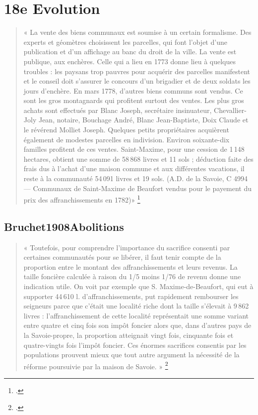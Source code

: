 \documentclass[12pt,a4paper]{report}
\begin{document}
	
\chapter{18e Evolution}


\begin{quote}
	« La vente des biens communaux est soumise à un certain formalisme. Des experts et géomètres choisissent les parcelles, qui font l’objet d’une publication et d’un affichage au banc du droit de la ville. La vente est publique, aux enchères. Celle qui a lieu en 1773 donne lieu à quelques troubles : les paysans trop pauvres pour acquérir des parcelles manifestent et le conseil doit s’assurer le concours d’un brigadier et de deux soldats les jours d’enchère. En mars 1778, d’autres biens communs sont vendus. Ce sont les gros montagnards qui profitent surtout des ventes. Les plus gros achats sont effectués par Blanc Joseph, secrétaire insinuateur, Chevallier-Joly Jean, notaire, Bouchage André, Blanc Jean-Baptiste, Doix Claude et le révérend Molliet Joseph. Quelques petits propriétaires acquièrent également de modestes parcelles en indivision. Environ soixante-dix familles profitent de ces ventes. Saint-Maxime, pour une cession de 1\,148 hectares, obtient une somme de 58\,868 livres et 11 sols ; déduction faite des frais dus à l’achat d’une maison commune et aux différentes vacations, il reste à la communauté 54\,091 livres et 19 sols. (A.D. de la Savoie, C 4994 — Communaux de Saint-Maxime de Beaufort vendus pour le payement du prix des affranchissements en 1782)»
	\footcite[127]{BordeVibertGuigue1971VieRuraleBeaufort}
\end{quote}


\section{Bruchet1908Abolitions}
\begin{quote}
	« Toutefois, pour comprendre l’importance du sacrifice consenti par certaines communautés pour se libérer, il faut tenir compte de la proportion entre le montant des affranchissements et leurs revenus. La taille foncière calculée à raison du 1/5 moins 1/76 de revenu donne une indication utile. On voit par exemple que S. Maxime-de-Beaufort, qui eut à supporter 44\,610 l. d’affranchissements, put rapidement rembourser les seigneurs parce que c’était une localité riche dont la taille s’élevait à 9\,862 livres : l’affranchissement de cette localité représentait une somme variant entre quatre et cinq fois son impôt foncier alors que, dans d’autres pays de la Savoie-propre, la proportion atteignait vingt fois, cinquante fois et quatre-vingts fois l’impôt foncier. Ces énormes sacrifices consentis par les populations prouvent mieux que tout autre argument la nécessité de la réforme poursuivie par la maison de Savoie. »
	\footcite[LXXXI]{Bruchet1908Abolition}
\end{quote}
\end{document}
